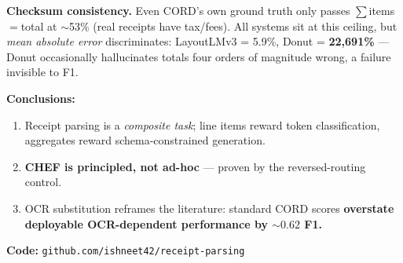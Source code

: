 \documentclass[landscape,a0paper,fontscale=0.30]{baposter}
\newcommand{\compresslist}{
\setlength{\itemsep}{0pt}
\setlength{\parskip}{0pt}
\setlength{\parsep}{0pt}
}
\begin{document}
\begin{poster}
{\smallskip

\textbf{Checksum consistency.} Even CORD's own ground truth only passes
$\sum$items$=$total at $\sim$53\% (real receipts have tax/fees). All systems sit at
this ceiling, but \emph{mean absolute error} discriminates: LayoutLMv3 = 5.9\%,
Donut = \textbf{22{,}691\%} — Donut occasionally hallucinates totals four orders of
magnitude wrong, a failure invisible to F1.

\smallskip

\textbf{Conclusions:}
\begin{enumerate}\compresslist
\item Receipt parsing is a \emph{composite task}; line items reward token
classification, aggregates reward schema-constrained generation.
\item \textbf{CHEF is principled, not ad-hoc} — proven by the reversed-routing control.
\item OCR substitution reframes the literature: standard CORD scores
\textbf{overstate deployable OCR-dependent performance by $\sim 0.62$ F1.}
\end{enumerate}

\centering \small \textbf{Code:} \texttt{github.com/ishneet42/receipt-parsing}
}

\end{poster}
\end{document}
